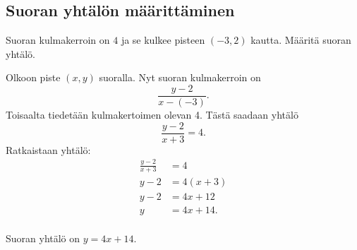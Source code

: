 



\subsection*{Suoran yhtälön määrittäminen}

\begin{esimerkki}
Suoran kulmakerroin on $4$ ja se kulkee pisteen $(-3, 2)$ kautta. Määritä suoran yhtälö.

\begin{esimratk}
Olkoon piste $(x, y)$ suoralla. Nyt suoran kulmakerroin on 
\[
\frac{y-2}{x-(-3)}.
\]
Toisaalta tiedetään kulmakertoimen olevan 4. Tästä saadaan yhtälö
\[
\frac{y-2}{x+3}=4.
\]
Ratkaistaan yhtälö:
\begin{align*}
\frac{y-2}{x+3}&=4 \\
y-2&=4(x+3) \\
y-2&=4x+12 \\
y&=4x+14. \\
\end{align*}
\end{esimratk}

\begin{esimvast}
Suoran yhtälö on $y=4x+14$.
\end{esimvast}
\end{esimerkki}

